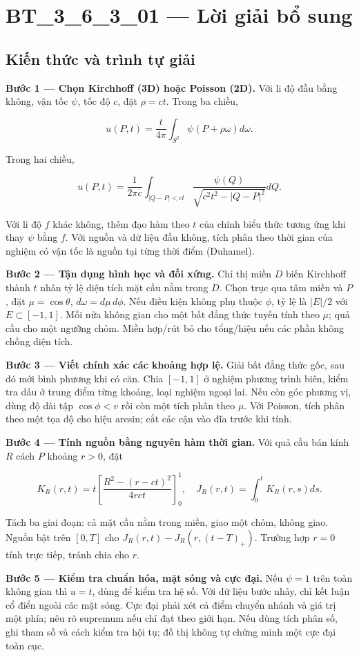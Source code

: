 \documentclass[10pt,a4paper]{article}
\begin{document}
\section*{BT\_3\_6\_3\_01 — Lời giải bổ sung}
\subsection*{Kiến thức và trình tự giải}
\textbf{Bước 1 — Chọn Kirchhoff (3D) hoặc Poisson (2D).} Với li độ đầu bằng không, vận tốc $\psi$, tốc độ $c$, đặt $\rho=ct$. Trong ba chiều,


\[
u(P,t)=\frac t{4\pi}\int_{S^2}\psi(P+\rho\omega)d\omega.
\]


Trong hai chiều,


\[
u(P,t)=\frac1{2\pi c}\int_{|Q-P|<ct}\frac{\psi(Q)}{\sqrt{c^2t^2-|Q-P|^2}}dQ.
\]


Với li độ $f$ khác không, thêm đạo hàm theo $t$ của chính biểu thức tương ứng khi thay $\psi$ bằng $f$. Với nguồn và dữ liệu đầu không, tích phân theo thời gian của nghiệm có vận tốc là nguồn tại từng thời điểm (Duhamel).

\textbf{Bước 2 — Tận dụng hình học và đối xứng.} Chỉ thị miền $D$ biến Kirchhoff thành $t$ nhân tỷ lệ diện tích mặt cầu nằm trong $D$. Chọn trục qua tâm miền và $P$, đặt $\mu=\cos\theta$, $d\omega=d\mu\,d\phi$. Nếu điều kiện không phụ thuộc $\phi$, tỷ lệ là $|E|/2$ với $E\subset[-1,1]$. Mỗi nửa không gian cho một bất đẳng thức tuyến tính theo $\mu$; quả cầu cho một ngưỡng chỏm. Miền hợp/rút bỏ cho tổng/hiệu nếu các phần không chồng diện tích.

\textbf{Bước 3 — Viết chính xác các khoảng hợp lệ.} Giải bất đẳng thức gốc, sau đó mới bình phương khi có căn. Chia $[-1,1]$ ở nghiệm phương trình biên, kiểm tra dấu ở trung điểm từng khoảng, loại nghiệm ngoại lai. Nếu còn góc phương vị, dùng độ dài tập $\cos\phi<v$ rồi còn một tích phân theo $\mu$. Với Poisson, tích phân theo một tọa độ cho hiệu arcsin; cắt các cận vào đĩa trước khi tính.

\textbf{Bước 4 — Tính nguồn bằng nguyên hàm thời gian.} Với quả cầu bán kính $R$ cách $P$ khoảng $r>0$, đặt


\[
K_R(r,t)=t\left[\frac{R^2-(r-ct)^2}{4rct}\right]_0^1,\quad J_R(r,t)=\int_0^tK_R(r,s)ds.
\]


Tách ba giai đoạn: cả mặt cầu nằm trong miền, giao một chỏm, không giao. Nguồn bật trên $[0,T]$ cho $J_R(r,t)-J_R(r,(t-T)_+)$. Trường hợp $r=0$ tính trực tiếp, tránh chia cho $r$.

\textbf{Bước 5 — Kiểm tra chuẩn hóa, mặt sóng và cực đại.} Nếu $\psi=1$ trên toàn không gian thì $u=t$, dùng để kiểm tra hệ số. Với dữ liệu bước nhảy, chỉ kết luận cổ điển ngoài các mặt sóng. Cực đại phải xét cả điểm chuyển nhánh và giá trị một phía; nêu rõ supremum nếu chỉ đạt theo giới hạn. Nếu dùng tích phân số, ghi tham số và cách kiểm tra hội tụ; đồ thị không tự chứng minh một cực đại toàn cục.
\end{document}
